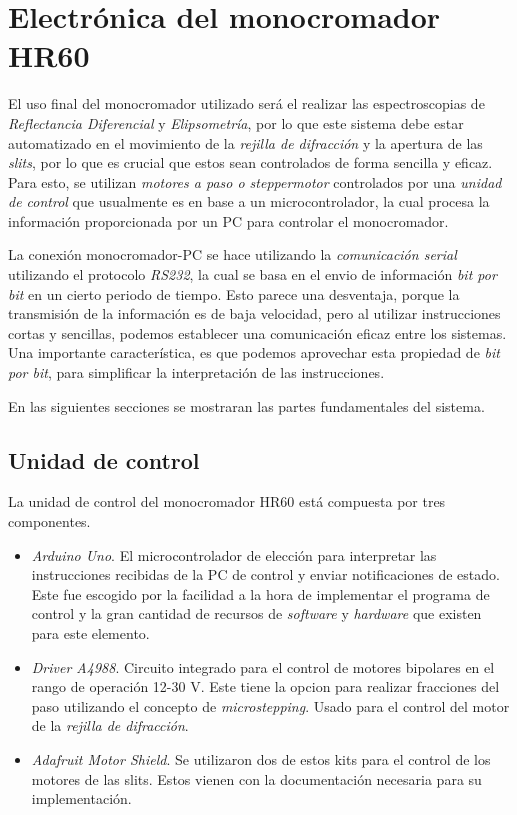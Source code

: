 \section{Electrónica del monocromador HR60}
\label{sec:ch2-electronic}
El uso final del monocromador utilizado será el realizar las espectroscopias de \textit{Reflectancia Diferencial} y \textit{Elipsometría}, por lo que este sistema debe estar automatizado en el movimiento de la \textit{rejilla de difracción} y la apertura de las \textit{slits}, por lo que es crucial que estos sean controlados de forma sencilla y eficaz. Para esto, se utilizan \textit{motores a paso o steppermotor} controlados por una \textit{unidad de control} que usualmente es en base a un microcontrolador, la cual procesa la información proporcionada por un PC para controlar el monocromador. 

La conexión monocromador-PC se hace utilizando la \textit{comunicación serial} utilizando el protocolo \textit{RS232}, la cual se basa en el envio de información \textit{bit por bit} en un cierto periodo de tiempo. Esto parece una desventaja, porque la transmisión de la información es de baja velocidad, pero al utilizar instrucciones cortas y sencillas, podemos establecer una comunicación eficaz entre los sistemas. Una importante característica, es que podemos aprovechar esta propiedad de \textit{bit por bit}, para simplificar la interpretación de las instrucciones.

En las siguientes secciones se mostraran las partes fundamentales del sistema.

\subsection{Unidad de control}
\label{sec:ch2-control-unit}
La unidad de control del monocromador HR60 está compuesta por tres componentes.
\begin{itemize}
    \item \textit{Arduino Uno}. El microcontrolador de elección para interpretar las instrucciones recibidas de la PC de control y enviar notificaciones de estado. Este fue escogido por la facilidad a la hora de implementar el programa de control y la gran cantidad de recursos de \textit{software} y \textit{hardware} que existen para este elemento.
    \item \textit{Driver A4988}. Circuito integrado para el control de motores bipolares en el rango de operación 12-30 V. Este tiene la opcion para realizar fracciones del paso utilizando el concepto de \textit{microstepping}. Usado para el control del motor de la \textit{rejilla de difracción}.
    \item \textit{Adafruit Motor Shield}. Se utilizaron dos de estos kits para el control de los motores de las slits. Estos vienen con la documentación necesaria para su implementación.
\end{itemize}

